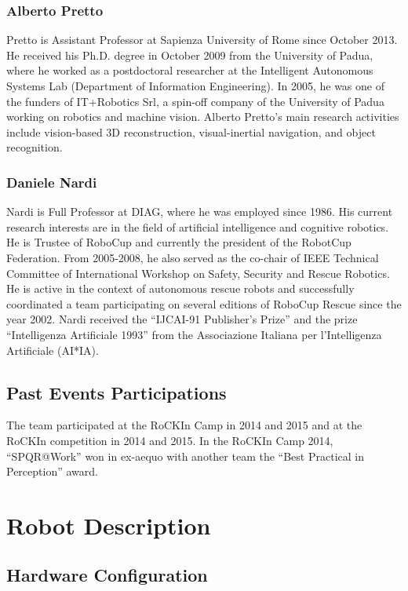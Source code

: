 \documentclass{llncs}
\begin{document}
\subsubsection*{Alberto Pretto}

Pretto is Assistant Professor at Sapienza University of Rome since October 2013. 
He received his Ph.D. degree in October 2009 from the University of Padua, where he worked as a postdoctoral researcher at the Intelligent Autonomous Systems Lab (Department of Information Engineering). 
In 2005, he was one of the funders of IT+Robotics Srl, a spin-off company of the University of Padua working on robotics and machine vision. 
Alberto Pretto's main research activities include vision-based 3D reconstruction, visual-inertial navigation, and object recognition.

\subsubsection*{Daniele Nardi}

Nardi is Full Professor at DIAG, where he was employed since 1986. His current research interests are in the field of artificial intelligence and cognitive robotics. He is Trustee of RoboCup and currently the president of the RobotCup Federation.  From 2005-2008, he also served as the co-chair of IEEE Technical Committee of International Workshop on Safety, Security and Rescue Robotics.  He is active in the context of autonomous rescue robots and successfully coordinated a team participating on several editions of RoboCup Rescue since the year 2002.  
Nardi received the ``IJCAI-91 Publisher's Prize'' and the prize ``Intelligenza Artificiale 1993'' from the Associazione Italiana per l'Intelligenza Artificiale (AI*IA).

\subsection{Past Events Participations}

The team participated at the RoCKIn Camp in 2014 and 2015 and at the RoCKIn competition in 2014 and 2015. In the RoCKIn Camp 2014, ``SPQR@Work'' won in ex-aequo with another team the ``Best Practical in Perception'' award.

\section{Robot Description}

\subsection{Hardware Configuration}
\end{document}
